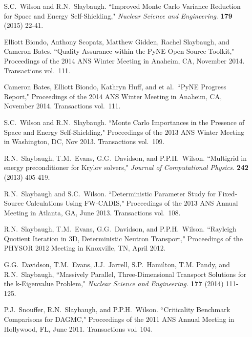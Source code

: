 \begin{bibsection}
\item S.C.\ Wilson and R.N.\ Slaybaugh. ``Improved Monte Carlo Variance Reduction for Space and Energy Self-Shielding," \textit{Nuclear Science and Engineering}. \textbf{179} (2015) 22-41.

\item Elliott Biondo, Anthony Scopatz, Matthew Gidden, Rachel Slaybaugh, and Cameron Bates. ``Quality Assurance within the PyNE Open Source Toolkit,"  Proceedings of the 2014 ANS Winter Meeting in Anaheim, CA, November 2014. Transactions vol.\ 111.

\item Cameron Bates, Elliott Biondo, Kathryn Huff, and et al.\ ``PyNE Progress Report," Proceedings of the 2014 ANS Winter Meeting in Anaheim, CA, November 2014. Transactions vol.\ 111.

\item S.C.\ Wilson and R.N.\ Slaybaugh. ``Monte Carlo Importances in the Presence of Space and Energy Self-Shielding," Proceedings of the 2013 ANS Winter Meeting in Washington, DC, Nov 2013. Transactions vol.\ 109.

\item R.N.\ Slaybaugh, T.M.\ Evans, G.G.\ Davidson, and P.P.H.\ Wilson. ``Multigrid in energy preconditioner for Krylov solvers," \textit{Journal of Computational Physics}. \textbf{242} (2013) 405-419.

\item R.N.\ Slaybaugh and  S.C.\ Wilson. ``Deterministic Parameter Study for Fixed-Source Calculations Using FW-CADIS," Proceedings of the 2013 ANS Annual Meeting in Atlanta, GA, June 2013. Transactions vol.\ 108.

\item R.N.\ Slaybaugh, T.M.\ Evans, G.G.\ Davidson, and P.P.H.\ Wilson. ``Rayleigh Quotient Iteration in 3D, Deterministic Neutron Transport," Proceedings of the PHYSOR 2012 Meeting in Knoxville, TN, April 2012.

\item G.G.\ Davidson, T.M.\ Evans, J.J.\ Jarrell, S.P.\ Hamilton, T.M. Pandy, and R.N.\ Slaybaugh, ``Massively Parallel, Three-Dimensional Transport Solutions for the k-Eigenvalue Problem," \textit{Nuclear Science and Engineering}. \textbf{177} (2014) 111-125.

\item P.J.\ Snouffer, R.N.\ Slaybaugh, and P.P.H.\ Wilson. ``Criticality Benchmark Comparisons for DAGMC," Proceedings of the 2011 ANS Annual Meeting in Hollywood, FL, June 2011. Transactions vol. 104.


\end{bibsection}
